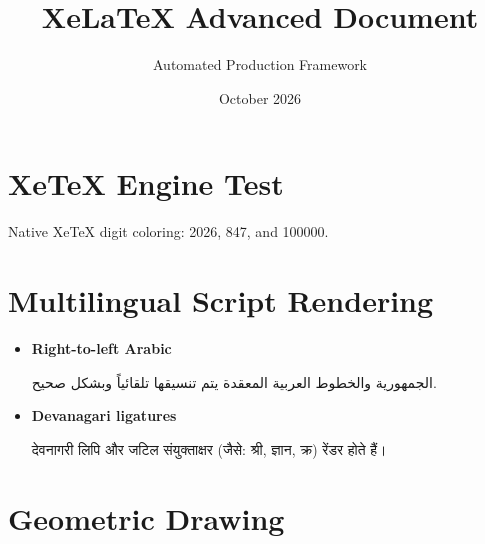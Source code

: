 \documentclass[11pt,a4paper]{article}
\title{\textbf{XeLaTeX Advanced Document}}
\author{Automated Production Framework}
\date{October 2026}
\begin{document}
\maketitle
\section{XeTeX Engine Test}
\begingroup
{}
Native XeTeX digit coloring: 2026, 847, and 100000.
\par
\endgroup
\section{Multilingual Script Rendering}
\begin{itemize}
  \item \textbf{Right-to-left Arabic}
    \begin{Arabic}
      الجمهورية والخطوط العربية المعقدة يتم تنسيقها تلقائياً وبشكل صحيح.
    \end{Arabic}
  \item \textbf{Devanagari ligatures}
    \begin{hindi}
      देवनागरी लिपि और जटिल संयुक्ताक्षर (जैसे: श्री, ज्ञान, क्र) रेंडर होते हैं।
    \end{hindi}
\end{itemize}
\section{Geometric Drawing}
\begin{center}
\end{center}
\end{document}
